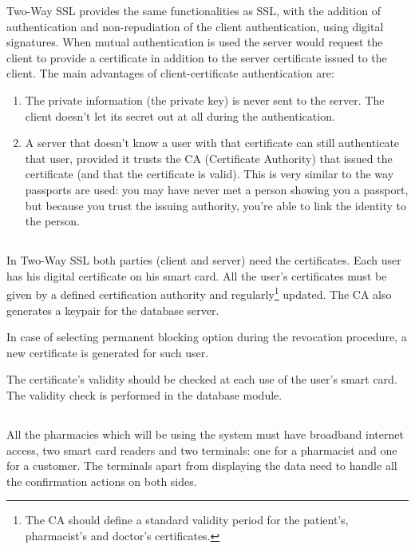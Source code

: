 Two-Way SSL provides the same functionalities as SSL, with the addition of authentication and non-repudiation of the client authentication, using digital signatures. When mutual authentication is used the server would request the client to provide a certificate in addition to the server certificate issued to the client.
The main advantages of client-certificate authentication are:
\begin{enumerate}
\item The private information (the private key) is never sent to the server. The client doesn't let its secret out at all during the authentication.
\item A server that doesn't know a user with that certificate can still authenticate that user, provided it trusts the CA (Certificate Authority) that issued the certificate (and that the certificate is valid). This is very similar to the way passports are used: you may have never met a person showing you a passport, but because you trust the issuing authority, you're able to link the identity to the person.
\end{enumerate}


\subsection{}

In Two-Way SSL both parties (client and server) need the certificates. Each user has his digital certificate on his smart card. All the user's certificates must be given by a defined certification authority and regularly\footnote{The CA should define a standard validity period for the patient's, pharmacist's and doctor's certificates.} updated. The CA also generates a keypair for the database server. 

In case of selecting permanent blocking option during the revocation procedure, a new certificate is generated for such user.

The certificate's validity should be checked at each use of the user's smart card. The validity check is performed in the database module.



\subsection{}

All the pharmacies which will be using the system must have broadband internet access, two smart card readers and two terminals: one for a pharmacist and one for a customer. The terminals apart from displaying the data need to handle all the confirmation actions on both sides. \newline



